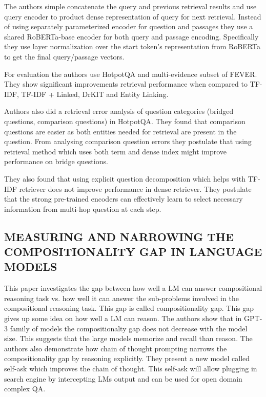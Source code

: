 \documentclass{article}
\begin{document}
The authors simple concatenate the query and previous retrieval results and use query encoder to product dense representation of query for next retrieval. Instead of using separately parameterized encoder for question and passages they use a shared RoBERTa-base encoder for both query and passage encoding. Specifically they use layer normalization over the start token's representation from RoBERTa to get the final query/passage vectors.

For evaluation the authors use HotpotQA and multi-evidence subset of FEVER. They show significant improvements retrieval performance when compared to TF-IDF, TF-IDF + Linked, DrKIT and Entity Linking. 

Authors also did a retrieval error analysis of question categories (bridged questions, comparison questions) in HotpotQA. They found that comparison questions are easier as both entities needed for retrieval are present in the question. From analysing comparison question errors they postulate that using retrieval method which uses both term and dense index might improve performance on bridge questions.

They also found that using explicit question decomposition which helps with TF-IDF retriever does not improve performance in dense retriever. They postulate that the strong pre-trained encoders can effectively learn to select necessary information from multi-hop question at each step.

  \subsection{MEASURING AND NARROWING THE COMPOSITIONALITY GAP IN LANGUAGE MODELS \cite{https://doi.org/10.48550/arxiv.2210.03350}}
This paper investigates the gap between how well a LM can answer compositional reasoning task vs. how well it can answer the sub-problems involved in the compositional reasoning task. This gap is called compositionality gap. This gap gives up some idea on how well a LM can reason. The authors show that in GPT-3 family of models the compositionalty gap does not decrease with the model size. This suggests that the large models memorize and recall than reason. The authors also demonstrate how chain of thought prompting narrows the compositionality gap by reasoning explicitly. They present a new model called self-ask which improves the chain of thought. This self-ask will allow plugging in search engine by intercepting LMs output and can be used for open domain complex QA.
\end{document}
